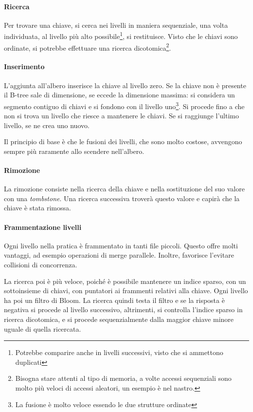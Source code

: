 \paragraph{Ricerca}
Per trovare una chiave, si cerca nei livelli in maniera sequenziale, 
una volta individuata, al livello più alto possibile\footnote{Potrebbe comparire 
anche in livelli successivi, visto che si ammettono duplicati}, si restituisce.
Visto che le chiavi sono ordinate, si potrebbe effettuare una ricerca 
dicotomica\footnote{Bisogna stare attenti al tipo di memoria, a volte accessi sequenziali 
sono molto più veloci di accessi aleatori, un esempio è nel nastro.}.

\paragraph{Inserimento}
L'aggiunta all'albero inserisce la chiave al livello zero. Se la chiave non è presente il B-tree sale di dimensione, se eccede la dimensione massima: 
si considera un segmento contiguo di chiavi e si fondono con il livello uno\footnote{La fusione 
è molto veloce essendo le due strutture ordinate}.
Si procede fino a che non si trova un livello che riesce a mantenere le chiavi. 
Se si raggiunge l'ultimo livello, se ne crea uno nuovo. 

Il principio di base è che le fusioni dei livelli, che sono molto costose, avvengono sempre 
più raramente allo scendere nell'albero.

\paragraph{Rimozione}
La rimozione consiste nella ricerca della chiave e nella sostituzione del suo 
valore con una \emph{tombstone}. Una ricerca successiva troverà questo valore e capirà 
che la chiave è stata rimossa.

\paragraph{Frammentazione livelli}
Ogni livello nella pratica è frammentato in tanti file piccoli. Questo offre 
molti vantaggi, ad esempio operazioni di merge parallele. Inoltre, favorisce 
l'evitare collisioni di concorrenza. 

La ricerca poi è più veloce, poiché è 
possibile mantenere un indice sparso, con un sottoinsieme di chiavi, con puntatori 
ai frammenti relativi alla chiave. Ogni livello ha poi un filtro di Bloom.
La ricerca quindi testa il filtro e se la risposta è negativa si procede al 
livello successivo, altrimenti, si controlla l'indice sparso in ricerca dicotomica, 
e si procede sequenzialmente dalla maggior chiave minore uguale di quella ricercata.

